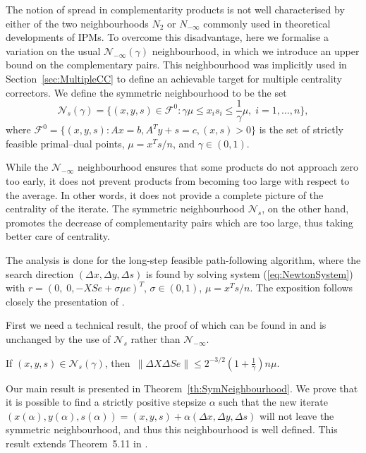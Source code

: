 The notion of spread in complementarity products
is not well characterised by either 
of the two neighbourhoods $N_2$ or $N_{-\infty}$ commonly used 
in theoretical developments of IPMs.
To overcome this disadvantage, here we formalise a variation 
on the usual $\mathcal{N}_{-\infty}(\gamma)$ neighbourhood, 
in which we introduce an upper bound on the complementary pairs. 
This neighbourhood was implicitly used in Section~\ref{sec:MultipleCC}
to define an achievable target for multiple centrality correctors.
We define the symmetric neighbourhood to be the set
\[
  \mathcal{N}_s(\gamma)=\{(x,y,s)\in \mathcal{F}^0: 
  \gamma\mu\le x_is_i \le \frac{1}{\gamma}\mu, \; i=1,\ldots,n\},
\]
where $\mathcal{F}^0=\{(x,y,s) : Ax=b,A^Ty+s=c,(x,s)>0\}$ 
is the set of strictly feasible primal--dual points,
$\mu = x^Ts/n$, and $\gamma \in (0,1)$.

While the $\mathcal{N}_{-\infty}$ neighbourhood ensures that some 
products do not approach zero too early, it does not prevent products
from becoming too large with respect to the average.
In other words, it does not provide a complete 
picture of the centrality of the iterate. The symmetric 
neighbourhood $\mathcal{N}_s$, on the other hand, promotes 
the decrease of complementarity pairs which are too large, thus taking 
better care of centrality.


The analysis is done for the long-step feasible path-following 
algorithm, where the search direction $(\Delta x, \Delta y, \Delta s)$ 
is found by solving system (\ref{eq:NewtonSystem}) with 
$r=(0,\; 0,-XSe+\sigma\mu e)^T$, $\sigma\in(0,1)$, $\mu=x^Ts/n$.
%
The exposition follows closely the presentation of 
\cite[Chapter~5]{ipm:Wright97}. 

First we need a technical result, the proof of which can be found 
in \cite[Lemma~5.10]{ipm:Wright97} and is unchanged by the use 
of $\mathcal{N}_s$ rather than $\mathcal{N}_{-\infty}$.
%
\begin{lemma} \label{Wright:5.10}
If $(x,y,s)\in \mathcal{N}_s(\gamma)$, then\,
\(
  \|\Delta X\Delta Se\| \le 2^{-3/2}\left( 1+ \displaystyle{\frac{1}{\gamma}} \right)n\mu.
\)
\end{lemma}

Our main result is presented in Theorem~\ref{th:SymNeighbourhood}. 
We prove that it is possible to find a strictly positive stepsize 
$\alpha$ such that the new iterate 
$(x(\alpha),y(\alpha),s(\alpha))=(x,y,s)+\alpha(\Delta x,\Delta y,\Delta s)$
will not leave the symmetric neighbourhood, and thus this 
neighbourhood is well defined. This result extends 
Theorem~5.11 in \cite{ipm:Wright97}.

